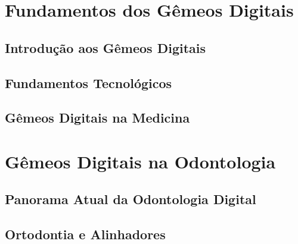 \documentclass[12pt,a4paper,oneside,openright]{abntex2}
\theoremstyle{definition}
\begin{document}



%
%
%
%
%

\listoffigures*
\cleardoublepage

\listoftables*
\cleardoublepage

\begingroup
\footnotesize
\lstlistoflistings
\endgroup
\cleardoublepage

\tableofcontents*
\cleardoublepage

\textual

\part{Fundamentos dos Gêmeos Digitais}
\chapter{Introdução aos Gêmeos Digitais} \label{ch:introducao}

\chapter{Fundamentos Tecnológicos} \label{ch:fundamentos}

\chapter{Gêmeos Digitais na Medicina} \label{ch:medicina}


\part{Gêmeos Digitais na Odontologia}
\chapter{Panorama Atual da Odontologia Digital} \label{ch:panorama}

\chapter{Ortodontia e Alinhadores} \label{ch:ortodontia}

\end{document}
